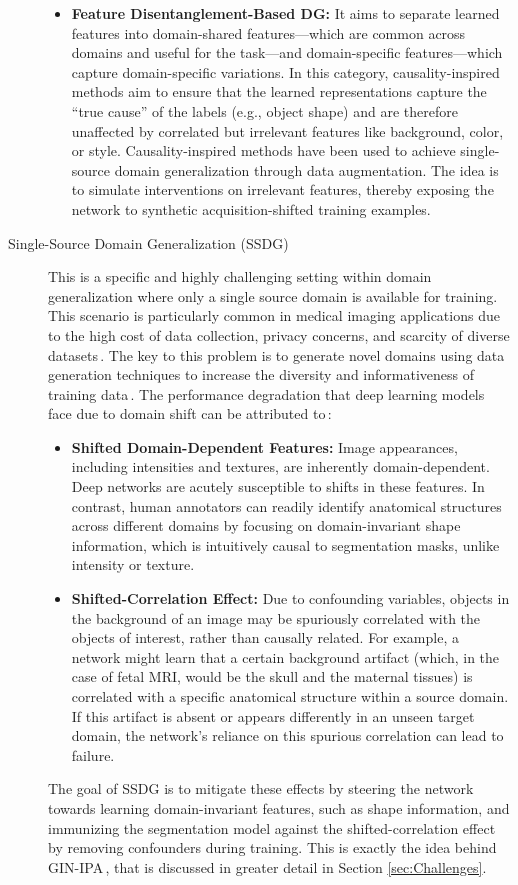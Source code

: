 \begin{description}
\begin{itemize}
        \item \textbf{Feature Disentanglement-Based DG:} It aims to separate learned features into domain-shared features---which are common across domains and useful for the task---and domain-specific features---which capture domain-specific variations. In this category, causality-inspired methods aim to ensure that the learned representations capture the \enquote{true cause} of the labels (e.g., object shape) and are therefore unaffected by correlated but irrelevant features like background, color, or style. Causality-inspired methods have been used to achieve single-source domain generalization through data augmentation. The idea is to simulate interventions on irrelevant features, thereby exposing the network to synthetic acquisition-shifted training examples.
    \end{itemize}
    \item[Single-Source Domain Generalization (SSDG)] This is a specific and highly challenging setting within domain generalization where only a single source domain is available for training. This scenario is particularly common in medical imaging applications due to the high cost of data collection, privacy concerns, and scarcity of diverse datasets\,\cite{Ouyang2023}. The key to this problem is to generate novel domains using data generation techniques to increase the diversity and informativeness of training data\,\cite{Wang2023}. The performance degradation that deep learning models face due to domain shift can be attributed to\,\cite{Ouyang2023}:
    \begin{itemize}
        \item \textbf{Shifted Domain-Dependent Features:} Image appearances, including intensities and textures, are inherently domain-dependent. Deep networks are acutely susceptible to shifts in these features. In contrast, human annotators can readily identify anatomical structures across different domains by focusing on domain-invariant shape information, which is intuitively causal to segmentation masks, unlike intensity or texture.
        \item \textbf{Shifted-Correlation Effect:} Due to confounding variables, objects in the background of an image may be spuriously correlated with the objects of interest, rather than causally related. For example, a network might learn that a certain background artifact (which, in the case of fetal MRI, would be the skull and the maternal tissues) is correlated with a specific anatomical structure within a source domain. If this artifact is absent or appears differently in an unseen target domain, the network's reliance on this spurious correlation can lead to failure.
    \end{itemize}
The goal of SSDG is to mitigate these effects by steering the network towards learning domain-invariant features, such as shape information, and immunizing the segmentation model against the shifted-correlation effect by removing confounders during training. This is exactly the idea behind GIN-IPA\,\cite{Ouyang2023}, that is discussed in greater detail in Section \ref{sec:Challenges}.
\end{description}


